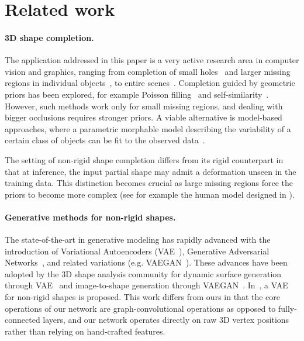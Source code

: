 \section{Related work}
\label{sec:relatedwork}
\paragraph{3D shape completion.} 
The application addressed in this paper is a very active research area in computer vision and graphics, ranging from completion of small holes~\cite{sarkar2017learning} and larger missing regions in individual objects~\cite{pointcloudGAN,rock2015completing,varley17iros,wu20153d,sharma16eccvw}, to entire scenes~\cite{song2016semantic}.
Completion guided by geometric priors has been explored, for example Poisson filling~\cite{kazhdan2013screened} and self-similarity~\cite{korman2015peeking,sarkar2017learning,litany2016cloud}. However, such methods work only for small missing regions, and dealing with bigger occlusions requires stronger priors. A viable alternative is model-based approaches, where a parametric morphable model describing the variability of a certain class of objects can be fit to the observed data~\cite{blanz1999morphable,gerig2017morphable}. 

The setting of non-rigid shape completion differs from its rigid counterpart in that at inference, the input partial shape may admit a deformation unseen in the training data. This distinction becomes crucial as large missing regions force the priors to become more complex (see for example the human model designed in \cite{anguelov2005scape}).

\paragraph{Generative methods for non-rigid shapes.} 
The state-of-the-art in generative modeling has rapidly advanced with the introduction of Variational Autoencoders (VAE~\cite{kingma2014iclr}), Generative Adversarial Networks~\cite{goodfellow2014generative}, and related variations (e.g. VAEGAN~\cite{larsen16icml}). These advances have been adopted by the 3D shape analysis community for dynamic surface generation through VAE~\cite{kostrikov2017surfnet} and image-to-shape generation through VAEGAN~\cite{wu16nips}. In~\cite{tan2017variational}, a VAE for non-rigid shapes is proposed. This work differs from ours in that the core operations of our network are graph-convolutional operations as opposed to fully-connected layers, and our network operates directly on raw 3D vertex positions rather than relying on hand-crafted features.

